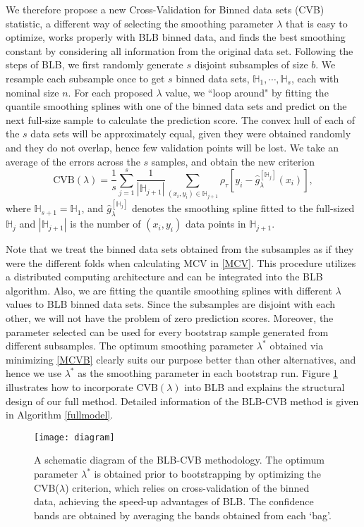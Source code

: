 \documentclass{statsoc}
\begin{document}
We therefore propose a new Cross-Validation for Binned data sets (CVB) statistic, a different way of selecting the smoothing parameter $\lambda$ that is easy to optimize, works properly with BLB binned data, and finds the best smoothing constant by considering all information from the original data set. Following the steps of BLB, we first randomly generate $s$ disjoint subsamples of size $b$. We resample each subsample once to get $s$ binned data sets, $\mathbb{H}_1,\cdots,\mathbb{H}_s$, each with nominal size $n$. For each proposed $\lambda$ value, we ``loop around" by  fitting the quantile smoothing splines with one of the binned data sets and predict on the next full-size sample to calculate the prediction score. The convex hull of each of the $s$ data sets will be approximately equal, given they were obtained randomly and they do not overlap, hence few validation points will be lost. We take an average of the errors across the $s$ samples, and obtain the new criterion
\begin{equation}
\label{MCVB}
    \mbox{CVB}(\lambda)=\frac{1}{s}\sum_{j=1}^{s} \frac{1}{|\mathbb{H}_{j+1}|}\sum_{(x_i,y_i)\in \mathbb{H}_{j+1}} \rho_{\tau}[y_i-\hat{g}_{\lambda}^{[\mathbb{H}_j]}(x_i)],
\end{equation}
where $\mathbb{H}_{s+1}=\mathbb{H}_1$, and $\hat{g}_{\lambda}^{[\mathbb{H}_j]}$ denotes the smoothing spline fitted to the full-sized $\mathbb{H}_j$ and $|\mathbb{H}_{j+1}|$ is the number of $(x_i,y_i)$ data points in $\mathbb{H}_{j+1}$. 

Note that we treat the binned data sets obtained from the subsamples as if they were the different folds when calculating MCV in \eqref{MCV}. This procedure utilizes a distributed computing architecture and can be integrated into the BLB algorithm. Also, we are fitting the quantile smoothing splines with different $\lambda$ values to BLB binned data sets. Since the subsamples are disjoint with each other, we will not have the problem of zero prediction scores. Moreover, the parameter selected can be used for every bootstrap sample generated from different subsamples. The optimum smoothing parameter $\lambda^*$ obtained via minimizing \eqref{MCVB} clearly suits our purpose better than other alternatives, and hence we use $\lambda^*$ as the smoothing parameter in each bootstrap run. Figure \ref{fig:diagram} illustrates how to incorporate $\text{CVB}(\lambda)$ into BLB and explains the structural design of our full method. Detailed information of the BLB-CVB method is given in Algorithm \ref{fullmodel}. 
\begin{figure}[H]
\texttt{[image: diagram]}
\centering
\caption{A schematic diagram of the BLB-CVB methodology. The optimum parameter $\lambda^*$ is obtained prior to bootstrapping by optimizing the CVB($\lambda$) criterion, which relies on cross-validation of the binned data, achieving the speed-up advantages of BLB. The confidence bands are obtained by averaging the bands obtained from each `bag'.}
\label{fig:diagram}
\end{figure}
\end{document}
